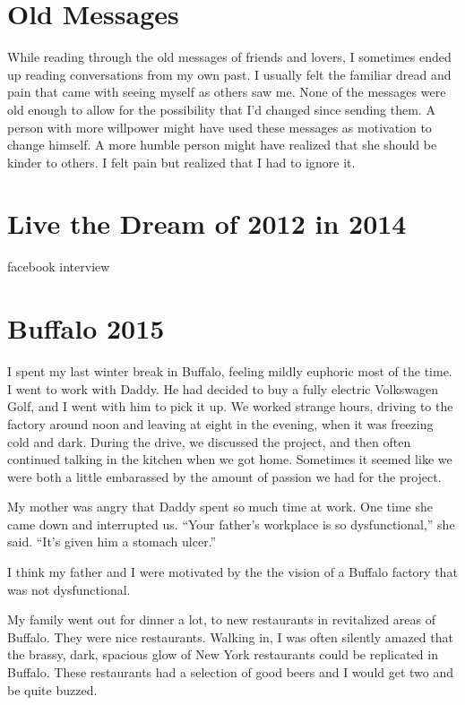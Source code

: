 \chapter{Old Messages}
While reading through the old messages of friends and lovers, I sometimes ended
up reading conversations from my own past.  I usually felt the familiar dread
and pain that came  with seeing myself as others saw me.  None of the messages
were old enough to allow for the possibility that I'd changed since sending
them.  A person with more willpower might have used these messages as motivation
to change himself.  A more humble person might have realized that she should be
kinder to others.  I felt pain but realized that I had to ignore it.

\chapter{Live the Dream of 2012 in 2014}
facebook interview

\chapter{Buffalo 2015}

I spent my last winter break in Buffalo, feeling mildly euphoric most of the
time.  I went to work with Daddy.  He had decided to buy a fully electric
Volkswagen Golf, and I went with him to pick it up.  We worked strange hours,
driving to the factory around noon and leaving at eight in the evening, when it
was freezing cold and dark.  During the drive, we discussed the project, and
then often continued talking in the kitchen when we got home.  Sometimes it
seemed like we were both a little embarassed by the amount of passion we
had for the project. 

My mother was angry that Daddy spent so much time at work.  One time she
came down and interrupted us.  ``Your father's workplace is so dysfunctional,''
she said.  ``It's given him a stomach ulcer.''

I think my father and I were motivated by the the vision of a Buffalo factory
that was not dysfunctional. 

My family went out for dinner a lot, to new restaurants in revitalized areas of
Buffalo.  They were nice restaurants.  Walking in, I was often silently amazed
that the brassy, dark, spacious glow of New York restaurants could be replicated
in Buffalo.  These restaurants had a selection of good beers and I would get two
and be quite buzzed.

